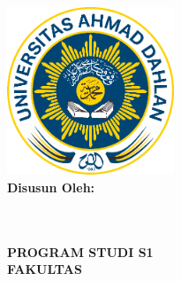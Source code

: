 
\newpage
{}
\begin{center}
        \textbf{\Large{\judulid}}\\[2cm]
        \textbf{\large{\MakeUppercase{\tipe}}}\\[2.0cm]

        \includegraphics[width=5cm, height=5cm]{gambar/logo-uad.png}\\[1.5cm]

        \normalsize{\textbf{Disusun Oleh:}} \\[0.5cm]
        \normalsize{\MakeUppercase{{\penulis}}} \\
        \normalsize{{\nim}}\\

        \vfill

        \textbf{\large{\MakeUppercase{PROGRAM STUDI S1 \prodi}}}\\
        \textbf{\large{\MakeUppercase{FAKULTAS \fakultas}}}\\
        \textbf{\large{\MakeUppercase{\universitas}}}\\[1cm]
        \textbf{\large{\the\year{}}}\\
\end{center}
